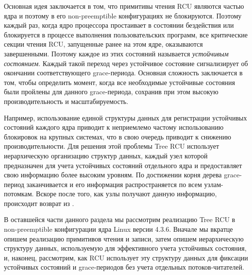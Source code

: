 %
%
Основная идея заключается в том, что примитивы чтения RCU являются
частью ядра и поэтому в его non-preemptible конфигурациях не блокируются.
Поэтому каждый раз, когда ядро процессора простаивает в состоянии бездействия
или блокируется в процессе выполнения пользовательских программ,
все критические секции чтения RCU, запущенные ранее на этом ядре,
оказываются завершенными.
Поэтому каждое из этих состояний называется \emph{устойчивым состоянием}.
Каждый такой переход через устойчивое состояние сигнализирует об
окончании соответствующего grace-периода.
Основная сложность заключается в том, чтобы определить момент,
когда все необходимые устойчивые состояния были пройлены для данного
grace-периода, сохранив при этом высокую производительность и масштабируемость.

Например, использование единой структуры данных для регистрации устойчивых
состояний каждого ядра приводит к неприемлемо частому использованию
блокировок на крупных системах, что в свою очередь приводит к снижению
производительности.
Для решения этой проблемы Tree RCU использует иерархическую организацию
структур данных, каждый узел которой предназначен для учета устойчивых
состояний отдельного ядра и предоставляет свою информацию более высоким уровням.
По достижении корня дерева grace-период заканчивается и
его информация распространяется по всем узлам-потомкам.
Вскоре после того, как узлы получают данную информацию,
происходит возврат из .

В оставшейся части данного раздела мы рассмотрим реализацию Tree RCU
в non-preemptible конфигурации ядра Linux версии 4.3.6.
Вначале мы вкратце опишем реализацию примитивов чтения и записи,
затем опишем иерархическую структуру данных, используемую для эффективного
учета устойчивых состояния, и, наконец, рассмотрим, как RCU использует
эту структуру данных для фиксации устойчивых состояний и grace-периодов
без учета отдельных потоков-читателей.






